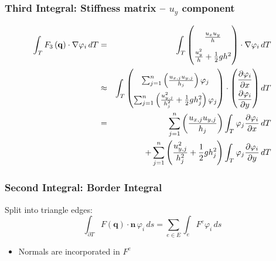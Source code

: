 \documentclass{beamer}
\newcommand{\pd}[2]{\dfrac{\partial #1}{\partial #2}}
\renewcommand{\phi}{\varphi}
\begin{document}
\begin{frame}
  \frametitle{Third Integral: Stiffness matrix -- $u_y$ component}
  \begin{eqnarray*}
    \int_T F_3\left(\mathbf{q}\right) \cdot \nabla \phi_i \, dT & = &
    \int_T
    \begin{pmatrix}
      \frac{u_x u_y}{h} \\ \frac{u_y^2}{h} + \frac{1}{2} g h^2
    \end{pmatrix}
    \cdot \nabla \phi_i \, dT \\
    & \approx & \int_T
    \begin{pmatrix}
      \sum_{j=1}^n \left(\frac{u_{x,j} u_{y,j}}{h_j}\right) \phi_j \\
      \sum_{j=1}^n \left(\frac{u_{y,j}^2}{h_j^2} + \frac{1}{2} g h_j^2\right) \phi_j \\
    \end{pmatrix}
    \cdot
    {
      \renewcommand{\arraystretch}{2}
      \begin{pmatrix}
        \pd{\phi_i}{x} \\
        \pd{\phi_i}{y}
      \end{pmatrix} dT
    } \\
    & = & \sum_{j=1}^n \left(\frac{u_{x,j} u_{y,j}}{h_j}\right) \int_T \phi_j \pd{\phi_i}{x} \, dT \\
    & {} & + \sum_{j=1}^n \left(\frac{u_{y,j}^2}{h_j^2} + \frac{1}{2} g h_j^2\right) \int_T \phi_j \pd{\phi_i}{y} \, dT
  \end{eqnarray*}
\end{frame}

\begin{frame}
  \frametitle{Second Integral: Border Integral}
  Split into triangle edges:
  \begin{equation}
    \label{eq:border-integral-sum}
    \int_{\partial T} F(\mathbf{q}) \cdot \mathbf{n} \, \phi_i \, ds = \sum_{e \in E} \int_{e} F^e \phi_i \, ds
  \end{equation}
  \begin{itemize}
  \item Normals are incorporated in $F^e$
  \end{itemize}
\end{frame}
\end{document}
